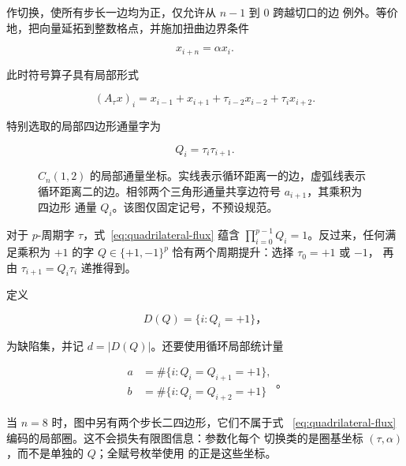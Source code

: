 作切换，使所有步长一边均为正，仅允许从 \(n-1\) 到 \(0\) 跨越切口的边
例外。等价地，把向量延拓到整数格点，并施加扭曲边界条件

\begin{equation}
x_{i+n}=\alpha x_i.
\end{equation}

此时符号算子具有局部形式

\begin{equation}
\label{eq:periodic-operator}
(A_\tau x)_i=x_{i-1}+x_{i+1}+\tau_{i-2}x_{i-2}+\tau_i x_{i+2}.
\end{equation}

特别选取的局部四边形通量字为

\begin{equation}
\label{eq:quadrilateral-flux}
Q_i=\tau_i \tau_{i+1}.
\end{equation}

\begin{figure}[tbp]
\centering

\caption{\(C_n(1,2)\) 的局部通量坐标。实线表示循环距离一的边，虚弧线表示
循环距离二的边。相邻两个三角形通量共享边符号 \(a_{i+1}\)，其乘积为四边形
通量 \(Q_i\)。该图仅固定记号，不预设规范。}
\label{fig:flux-coordinates}
\end{figure}

对于 \(p\)-周期字 \(\tau\)，式~\eqref{eq:quadrilateral-flux} 蕴含
\(\prod_{i=0}^{p-1}Q_i=1\)。反过来，任何满足乘积为 \(+1\) 的字
\(Q\in\{+1,-1\}^p\) 恰有两个周期提升：选择 \(\tau_0=+1\) 或 \(-1\)，
再由 \(\tau_{i+1}=Q_i\tau_i\) 递推得到。

定义

\begin{equation}
D(Q)=\{i:Q_i=+1\}\text{，}
\end{equation}

为缺陷集，并记 \(d=\lvert D(Q)\rvert\)。还要使用循环局部统计量

\begin{equation}
\label{eq:local-defect-statistics}
\begin{aligned}
a&=\#\{i:Q_i=Q_{i+1}=+1\}, \\
b&=\#\{i:Q_i=Q_{i+2}=+1\}
\end{aligned}
\text{。}
\end{equation}

当 \(n=8\) 时，图中另有两个步长二四边形，它们不属于式~
\eqref{eq:quadrilateral-flux} 编码的局部圈。这不会损失有限图信息：参数化每个
切换类的是圈基坐标 \((\tau,\alpha)\)，而不是单独的 \(Q\)；全赋号枚举使用
的正是这些坐标。

